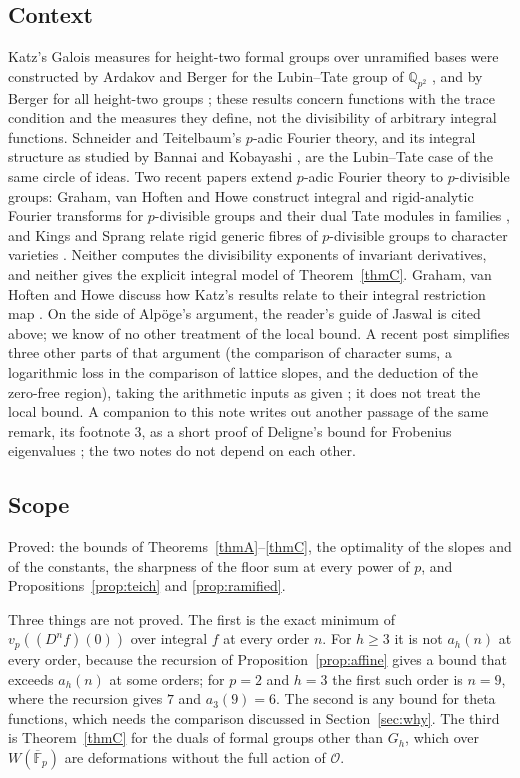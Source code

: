 \documentclass[11pt]{amsart}
\theoremstyle{definition}
\theoremstyle{remark}
\newcommand{\Q}{\mathbb Q}
\newcommand{\F}{\mathbb F}
\newcommand{\vp}{v_p}
\begin{document}
\subsection{Context}
Katz's Galois measures for height-two formal groups over unramified bases were constructed by Ardakov and Berger for the Lubin--Tate group of $\Q_{p^2}$ \cite{AB24}, and by Berger for all height-two groups \cite{Berger25}; these results concern functions with the trace condition and the measures they define, not the divisibility of arbitrary integral functions. Schneider and Teitelbaum's $p$-adic Fourier theory, and its integral structure as studied by Bannai and Kobayashi \cite{BK16}, are the Lubin--Tate case of the same circle of ideas. Two recent papers extend $p$-adic Fourier theory to $p$-divisible groups: Graham, van Hoften and Howe construct integral and rigid-analytic Fourier transforms for $p$-divisible groups and their dual Tate modules in families \cite[Theorems 7.0.2 and 7.2.6]{GHH25}, and Kings and Sprang relate rigid generic fibres of $p$-divisible groups to character varieties \cite[Theorem 7.1]{KS26}. Neither computes the divisibility exponents of invariant derivatives, and neither gives the explicit integral model of Theorem~\ref{thmC}. Graham, van Hoften and Howe discuss how Katz's results relate to their integral restriction map \cite[Remark 7.2.4]{GHH25}. On the side of Alp\"oge's argument, the reader's guide of Jaswal \cite{Jaswal} is cited above; we know of no other treatment of the local bound. A recent post simplifies three other parts of that argument (the comparison of character sums, a logarithmic loss in the comparison of lattice slopes, and the deduction of the zero-free region), taking the arithmetic inputs as given \cite{Three}; it does not treat the local bound. A companion to this note writes out another passage of the same remark, its footnote 3, as a short proof of Deligne's bound for Frobenius eigenvalues \cite{DeligneNote}; the two notes do not depend on each other.

\subsection{Scope}
Proved: the bounds of Theorems~\ref{thmA}--\ref{thmC}, the optimality of the slopes and of the constants, the sharpness of the floor sum at every power of $p$, and Propositions~\ref{prop:teich} and \ref{prop:ramified}.

Three things are not proved. The first is the exact minimum of $\vp((D^nf)(0))$ over integral $f$ at every order $n$. For $h\ge3$ it is not $a_h(n)$ at every order, because the recursion of Proposition~\ref{prop:affine} gives a bound that exceeds $a_h(n)$ at some orders; for $p=2$ and $h=3$ the first such order is $n=9$, where the recursion gives $7$ and $a_3(9)=6$. The second is any bound for theta functions, which needs the comparison discussed in Section~\ref{sec:why}. The third is Theorem~\ref{thmC} for the duals of formal groups other than $G_h$, which over $W(\overline{\F}_p)$ are deformations without the full action of $\mathcal O$.
\end{document}
